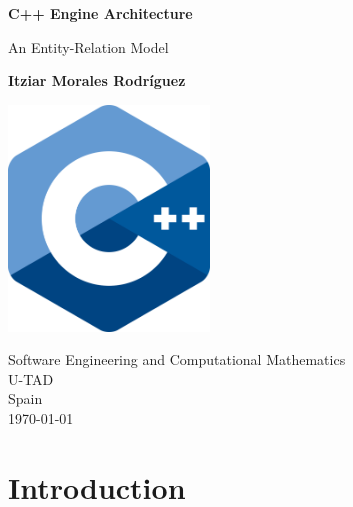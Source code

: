 \documentclass[12pt,a4paper]{report}
\let\oldsection\section
\renewcommand\section{\clearpage\oldsection}
\begin{document}
\pagestyle{empty}

\begin{titlepage}
	\begin{center}
		\vspace*{1cm}

		\Huge
		\textbf{C++ Engine Architecture}

		\vspace{0.5cm}
		\LARGE
		An Entity-Relation Model

		\vspace{1.5cm}

		\textbf{Itziar Morales Rodríguez}

		\vfill

		\vspace{0.8cm}

		\includegraphics[width=0.4\textwidth]{imgs/cpp-logo.png}

		\Large
		Software Engineering and Computational Mathematics\\
		U-TAD\\
		Spain\\
		\today

	\end{center}
\end{titlepage}
\pagebreak

\begin{abstract}
\end{abstract}
\pagebreak

\tableofcontents

\pagebreak
\pagestyle{myheader}
\setcounter{page}{1}

\section{Introduction} %
\par


\end{document}
